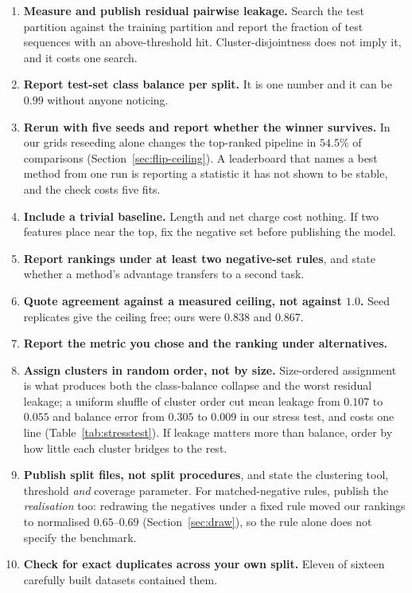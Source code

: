 \documentclass[11pt,a4paper]{article}
\begin{document}
\begin{enumerate}[leftmargin=1.6em,itemsep=2pt]
\item \textbf{Measure and publish residual pairwise leakage.} Search the test partition
  against the training partition and report the fraction of test sequences with an
  above-threshold hit. Cluster-disjointness does not imply it, and it costs one search.
\item \textbf{Report test-set class balance per split.} It is one number and it can be
  $0.99$ without anyone noticing.
\item \textbf{Rerun with five seeds and report whether the winner survives.} In our grids
  reseeding alone changes the top-ranked pipeline in $54.5\%$ of comparisons
  (Section~\ref{sec:flip-ceiling}). A leaderboard that names a best method from one run is
  reporting a statistic it has not shown to be stable, and the check costs five fits.
\item \textbf{Include a trivial baseline.} Length and net charge cost nothing. If two
  features place near the top, fix the negative set before publishing the model.
\item \textbf{Report rankings under at least two negative-set rules}, and state whether a
  method's advantage transfers to a second task.
\item \textbf{Quote agreement against a measured ceiling, not against $1.0$.} Seed
  replicates give the ceiling free; ours were $0.838$ and $0.867$.
\item \textbf{Report the metric you chose and the ranking under alternatives.}
\item \textbf{Assign clusters in random order, not by size.} Size-ordered assignment is what
  produces both the class-balance collapse and the worst residual leakage; a uniform shuffle
  of cluster order cut mean leakage from $0.107$ to $0.055$ and balance error from $0.305$ to
  $0.009$ in our stress test, and costs one line (Table~\ref{tab:stresstest}). If leakage
  matters more than balance, order by how little each cluster bridges to the rest.
\item \textbf{Publish split files, not split procedures}, and state the clustering tool,
  threshold \emph{and} coverage parameter. For matched-negative rules, publish the
  \emph{realisation} too: redrawing the negatives under a fixed rule moved our rankings to
  normalised $0.65$--$0.69$ (Section~\ref{sec:draw}), so the rule alone does not specify the
  benchmark.
\item \textbf{Check for exact duplicates across your own split.} Eleven of sixteen
  carefully built datasets contained them.
\end{enumerate}
\end{document}
